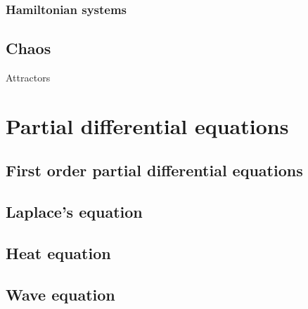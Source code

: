 \documentclass{../note}
\begin{document}
\section{Hamiltonian systems}

\chapter{Chaos}
Attractors





\part{Partial differential equations}
\chapter{First order partial differential equations}
\chapter{Laplace's equation}
\chapter{Heat equation}
\chapter{Wave equation}
\end{document}
